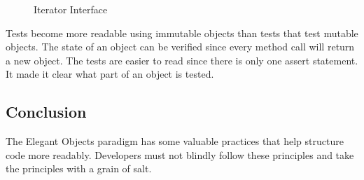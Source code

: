 \begin{figure}[h]
    \caption{Iterator Interface}
    
    \label{fig:iterator}
\end{figure}

Tests become more readable using immutable objects than tests that test mutable objects.
The state of an object can be verified since every method call will return a new object.
The tests are easier to read since there is only one assert statement.
It made it clear what part of an object is tested.

\subsection{Conclusion}\label{subsec:conclusion}
The Elegant Objects paradigm has some valuable practices that help structure code more readably.
Developers must not blindly follow these principles and take the principles with a grain of salt.
